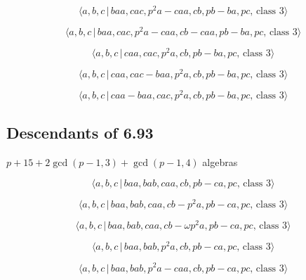 \documentclass[10pt]{article}
\begin{document}
\begin{equation}
\langle a,b,c\,|\,baa,cac,p^2a-caa,cb,pb-ba,pc,\,\text{class }3\rangle 
\tag{7.2802}
\end{equation}

\begin{equation}
\langle a,b,c\,|\,baa,cac,p^2a-caa,cb-caa,pb-ba,pc,\,\text{class }3\rangle 
\tag{7.2803}
\end{equation}

\begin{equation}
\langle a,b,c\,|\,caa,cac,p^2a,cb,pb-ba,pc,\,\text{class }3\rangle 
\tag{7.2804}
\end{equation}

\begin{equation}
\langle a,b,c\,|\,caa,cac-baa,p^2a,cb,pb-ba,pc,\,\text{class }3\rangle 
\tag{7.2805}
\end{equation}

\begin{equation}
\langle a,b,c\,|\,caa-baa,cac,p^2a,cb,pb-ba,pc,\,\text{class }3\rangle 
\tag{7.2806}
\end{equation}

\subsection{Descendants of 6.93}

$p+15+2\gcd (p-1,3)+\gcd (p-1,4)$ algebras

\begin{equation}
\langle a,b,c\,|\,baa,bab,caa,cb,pb-ca,pc,\,\text{class }3\rangle 
\tag{7.2807}
\end{equation}

\begin{equation}
\langle a,b,c\,|\,baa,bab,caa,cb-p^2a,pb-ca,pc,\,\text{class }3\rangle 
\tag{7.2808}
\end{equation}

\begin{equation}
\langle a,b,c\,|\,baa,bab,caa,cb-\omega p^{2}a,pb-ca,pc,\,\text{class }%
3\rangle  \tag{7.2809}
\end{equation}

\begin{equation}
\langle a,b,c\,|\,baa,bab,p^2a,cb,pb-ca,pc,\,\text{class }3\rangle 
\tag{7.2810}
\end{equation}

\begin{equation}
\langle a,b,c\,|\,baa,bab,p^2a-caa,cb,pb-ca,pc,\,\text{class }3\rangle 
\tag{7.2811}
\end{equation}
\end{document}
